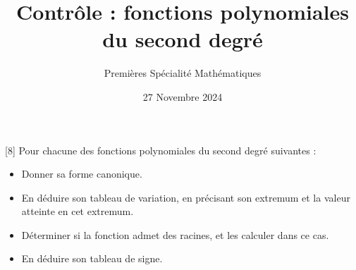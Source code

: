 \documentclass{exam}
\title{Contrôle : fonctions polynomiales du second degré}
\author{Premières Spécialité Mathématiques}
\date{27 Novembre 2024}
\begin{document}
\maketitle
{}

\begin{questions}
[8]
Pour chacune des fonctions polynomiales du second degré suivantes :
\begin{itemize}
\item Donner sa forme canonique.
\item En déduire son tableau de variation, en précisant son extremum et la valeur atteinte en cet extremum.
\item Déterminer si la fonction admet des racines, et les calculer dans ce cas.
\item En déduire son tableau de signe.
\end{itemize}
\end{questions}
\end{document}
